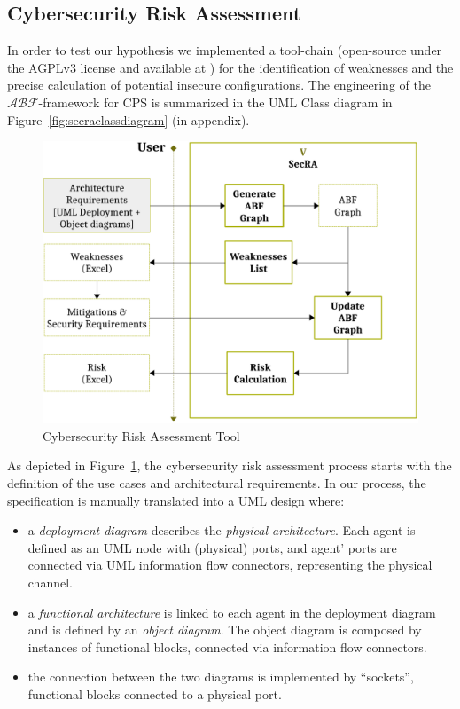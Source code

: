 \documentclass[conference]{IEEEtran}
\newcommand{\assertionRegion}{\mathcal{A}}
\newcommand{\beliefRegion}{\mathcal{B}}
\newcommand{\factRegion}{\mathcal{F}}
\newcommand{\abftheory}{\assertionRegion\beliefRegion\factRegion}
\begin{document}
\subsection{Cybersecurity Risk Assessment}\label{sec:secra}
In order to test our hypothesis we implemented a tool-chain (open-source under the
AGPLv3 license and available at \autocite{v-research2020cybersecurity-anonymous}) for the
identification of weaknesses and the precise calculation of potential insecure
configurations. The engineering of the $\abftheory$-framework for CPS is summarized in the UML
Class diagram in Figure~\ref{fig:secraclassdiagram} (in appendix). 

\begin{figure}
	\centering
	\includegraphics[width=.9\columnwidth]{v-secra.pdf}
	\caption{Cybersecurity Risk Assessment Tool}
	\label{fig:secra}
\end{figure}
As depicted in Figure~\ref{fig:secra}, the cybersecurity risk assessment process
starts with the definition of the use cases and architectural requirements.  In our process, the specification is manually
translated into a UML design where:
\begin{itemize}
	\item a \emph{deployment diagram} describes the \emph{physical
		architecture}. Each agent is defined as an UML node with (physical)
		ports, and agent' ports are connected via UML information flow
		connectors, representing the physical channel.
	\item a \emph{functional architecture} is linked to each agent in the
		deployment diagram and is defined by an \emph{object diagram}.
		The object diagram is composed by instances of functional
		blocks, connected via information flow connectors.
	\item the connection between the two diagrams is implemented by
		``sockets'', functional blocks connected to a 
		physical port.
\end{itemize}
\end{document}
